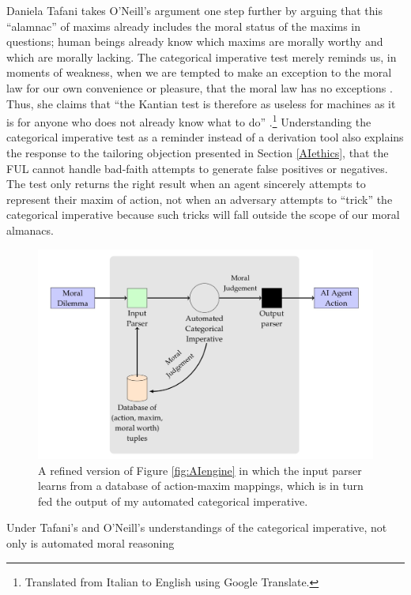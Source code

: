 \begin{isabellebody}
\begin{isamarkuptext}
Daniela Tafani takes O'Neill's argument one step further by arguing that this ``alamnac'' of maxims already 
includes the moral status of the maxims in questions; human beings already
know which maxims are morally worthy and which are morally lacking. The categorical imperative test
merely reminds us, in moments of weakness, when we are tempted to make an exception to the moral law for 
our own convenience or pleasure, that the moral law has no exceptions \citep[9]{tafani}. Thus, she claims
that ``the Kantian test is therefore as useless for machines as it is for anyone who does
not already know what to do'' \citep[8]{tafani}.\footnote{Translated from Italian to English using Google Translate.} 
Understanding the categorical imperative test as a reminder
instead of a derivation tool also explains the response to the tailoring objection presented in Section \ref{AIethics}, that the FUL cannot 
handle bad-faith attempts to generate false positives or negatives. The test only returns the right 
result when an agent sincerely attempts to represent their maxim of action, not when an adversary attempts
 to ``trick'' the categorical imperative because such tricks will fall outside the scope of our moral 
almanacs.%
\end{isamarkuptext}\isamarkuptrue%
%
\begin{figure}
\centering
\includegraphics[scale=0.19]{inputparser.jpeg}
\caption{A refined version of Figure \ref{fig:AIengine} in which the input parser learns from a database
of action-maxim mappings, which is in turn fed the output of my automated categorical imperative. } \label{fig:inputparser}
\end{figure}
%
\begin{isamarkuptext}%
Under Tafani's and O'Neill's understandings of the categorical imperative, not only is automated moral reasoning

\end{isamarkuptext}
\end{isabellebody}
